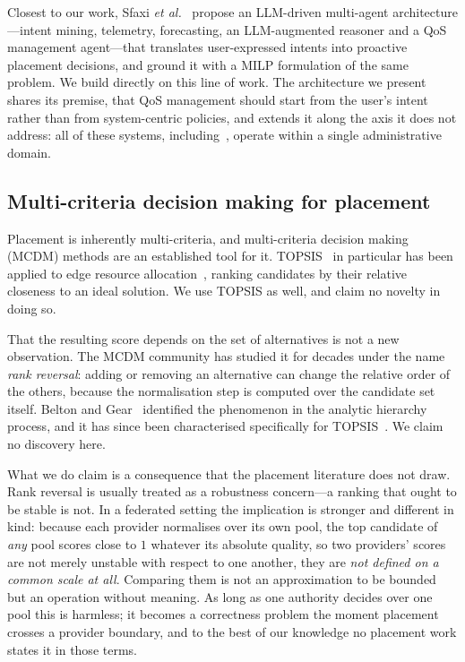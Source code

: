 \documentclass[conference]{IEEEtran}
\begin{document}
Closest to our work, Sfaxi \emph{et al.}~\cite{sfaxi2026policies} propose an
LLM-driven multi-agent architecture---intent mining, telemetry, forecasting,
an LLM-augmented reasoner and a QoS management agent---that translates
user-expressed intents into proactive placement decisions, and ground it with
a MILP formulation of the same problem. We build directly on this line of
work. The architecture we present shares its premise, that QoS management
should start from the user's intent rather than from system-centric policies,
and extends it along the axis it does not address: all of these systems,
including~\cite{sfaxi2026policies}, operate within a single administrative
domain.

\subsection{Multi-criteria decision making for placement}

Placement is inherently multi-criteria, and multi-criteria decision making
(MCDM) methods are an established tool for it. TOPSIS~\cite{hwang1981} in
particular has been applied to edge resource allocation~\cite{topsis2022edge},
ranking candidates by their relative closeness to an ideal solution. We use
TOPSIS as well, and claim no novelty in doing so.

That the resulting score depends on the set of alternatives is not a new
observation. The MCDM community has studied it for decades under the name
\emph{rank reversal}: adding or removing an alternative can change the
relative order of the others, because the normalisation step is computed over
the candidate set itself. Belton and Gear~\cite{belton1983} identified the
phenomenon in the analytic hierarchy process, and it has since been
characterised specifically for TOPSIS~\cite{garciacascales2012}. We claim no
discovery here.

What we do claim is a consequence that the placement literature does not draw.
Rank reversal is usually treated as a robustness concern---a ranking that
ought to be stable is not. In a federated setting the implication is
stronger and different in kind: because each provider normalises over its own
pool, the top candidate of \emph{any} pool scores close to $1$ whatever its
absolute quality, so two providers' scores are not merely unstable with
respect to one another, they are \emph{not defined on a common scale at all}.
Comparing them is not an approximation to be bounded but an operation without
meaning. As long as one authority decides over one pool this is harmless; it
becomes a correctness problem the moment placement crosses a provider
boundary, and to the best of our knowledge no placement work states it in
those terms.
\end{document}
